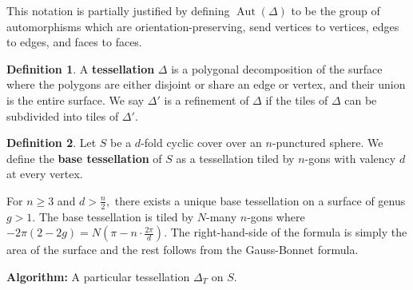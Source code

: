 \documentclass[12pt,reqno]{amsart}
\DeclareMathOperator{\Aut}{Aut}
\theoremstyle{definition}
\newtheorem{defn}{Definition}
\theoremstyle{remark}
\newcommand{\DD}{\Delta\kern -8.3pt {\diamond} \kern -4.5pt \cdot \:}
\begin{document}
This notation is partially justified by defining $\Aut(\Delta)$ to be the group of automorphisms which are orientation-preserving, send vertices to vertices, edges to edges, and faces to faces. 

\begin{defn} A \textbf{tessellation} $\Delta$ is a polygonal decomposition of the surface where the polygons are either disjoint or share an edge or vertex, and their union is the entire surface. We say $\Delta'$ is a refinement of $\Delta$ if the tiles of $\Delta$ can be subdivided into tiles of $\Delta'$. \end{defn}

\begin{defn} \label{defn: base tess} Let $S$ be a $d$-fold cyclic cover over an $n$-punctured sphere. We define the \textbf{base tessellation} of $S$ as a tessellation tiled by $n$-gons with valency $d$ at every vertex. \end{defn}

For $n \geq 3$ and $d > \frac{n}{2},$ there exists a unique base tessellation on a surface of genus $g > 1.$ The base tessellation is tiled by $N$-many $n$-gons where $-2 \pi (2 - 2 g) = N (\pi - n \cdot \frac{2 \pi}{d}).$ The right-hand-side of the formula is simply the area of the surface and the rest follows from the Gauss-Bonnet formula.


\textbf{Algorithm:} A particular tessellation $\Delta_T$ on $S$.


\end{document}

